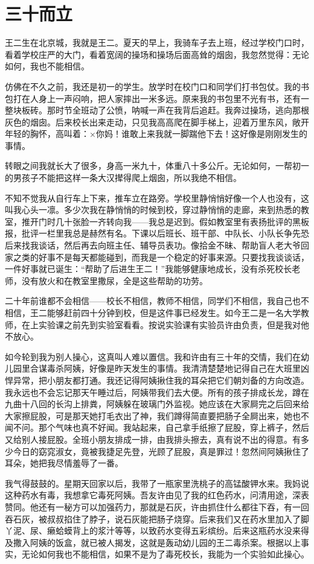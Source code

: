 \chapter{三十而立}

王二生在北京城，我就是王二。夏天的早上，我骑车子去上班，经过学校门口时，看着学校庄严的大门，看着宽阔的操场和操场后面高耸的烟囱，我忽然觉得：无论如何，我也不能相信。 
 
 仿佛在不久之前，我还是初一的学生。放学时在校门口和同学们打书包仗。我的书包打在人身上一声闷响，把人家摔出一米多远。原来我的书包里不光有书，还有一整块板砖。那时节全班动了公愤，呐喊一声在我背后追赶。我奔过操场，逃向那根灰色的烟囱。后来校长出来走动，只见我高高爬在脚手梯上，迎着万里东风，敞开年轻的胸怀，高叫着：×你妈！谁敢上来我就一脚踹他下去！这好像是刚刚发生的事情。 
 
 转眼之间我就长大了很多，身高一米九十，体重八十多公斤。无论如何，一帮初一的男孩子不能把这样一条大汉撵得爬上烟囱，所以我绝不相信。 
 
 不知不觉我从自行车上下来，推车立在路旁。学校里静悄悄好像一个人也没有，这叫我心头一凛。多少次我在静悄悄的时候到校，穿过静悄悄的走廊，来到热悉的教室，推开门时几十张脸一齐转向我——我总是迟到。假如教室里有表扬批评的黑板报，批评一栏里我总是赫然有名。下课以后班长、班干部、中队长、小队长争先恐后来找我谈话，然后再去向班主任、辅导员表功。像拾金不昧、帮助盲人老大爷回家之类的好事不是每天都能碰到，而我是一个稳定的好事来源。只要找我谈谈话，一件好事就已诞生：“帮助了后进生王二！”我能够健康地成长，没有杀死校长老师，没有放火和在教室里撒尿，全是这些帮助的功劳。 
 
 二十年前谁都不会相信——校长不相信，教师不相信，同学们不相信，我自己也不相信，王二能够赶前四十分钟到校，但是这件事已经发生。如今王二是一名大学教师，在上实验课之前先到实验室看看。按说实验课有实验员许由负责，但是我对他不放心。 
 
 如今轮到我为别人操心，这真叫人难以置信。我和许由有三十年的交情，我们在幼儿园里合谋毒杀阿姨，好像是昨天发生的事情。我清清楚楚地记得自己在大班里凶悍异常，把小朋友都打通。我还记得阿姨揪住我的耳朵把它们朝刘备的方向改造。我永远也不会忘记那天午睡过后，阿姨带我们去大便。所有的孩子排成长龙，蹲在九曲十八回的长沟上排粪，阿姨躲在玻璃门外监视。她应该在大家屙完之后回来给大家擦屁股，可是那天她打毛衣出了神，我们蹲得简直要把肠子全屙出来，她也不闻不问。那个气味也真不好闻。我站起来，自己拿手纸擦了屁股，穿上裤子，然后又给别人接屁股。全班小朋友排成一排，由我排头擦去，真有说不出的得意。有多少今日的窈窕淑女，竟被我捷足先登，光顾了屁股，真是罪过！忽然间阿姨揪住了耳朵，她把我尽情羞辱了一番。 
 
 我气得鼓鼓的。星期天回家以后，我带了一瓶家里洗桃子的高锰酸钾水来。我妈说这种药水有毒，我想拿它毒死阿姨。吾友许由见了我的红色药水，问清用途，深表赞同。他还有一秘方可以加强药力，那就是石灰，许由抓住什么都往下吞，有一回吞石灰，被叔叔掐住了脖子，说石灰能把肠子烧穿。后来我们又在药水里加入了脚丫泥、尿、癞蛤蟆背上的浆汁等等，以致药水变得五彩缤纷。后来这瓶药水没来得及撒入阿姨的饭盒，就已被人揭发，这就是轰动幼儿园的王二毒杀案。根据以上事实，无论如何我也不能相信，如果不是为了毒死校长，我能为一个实验如此操心。 
 
